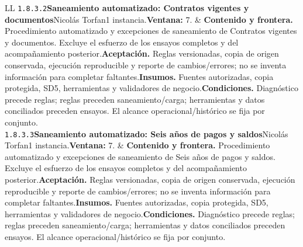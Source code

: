 \begin{longtable}{L{\tabcolsep\relax}L{\tabcolsep\relax}}
\texttt{1.\allowbreak{}8.\allowbreak{}3.\allowbreak{}2}\newline{}\textbf{Saneamiento automatizado: Contratos vigentes y documentos}\newline{}Nicolás Torfan\newline{}1 instancia.\newline{}\textbf{Ventana:} 7. & \textbf{Contenido y frontera.} Procedimiento automatizado y excepciones de saneamiento de Contratos vigentes y documentos. Excluye el esfuerzo de los ensayos completos y del acompañamiento posterior.\newline{}\textbf{Aceptación.} Reglas versionadas, copia de origen conservada, ejecución reproducible y reporte de cambios/errores; no se inventa información para completar faltantes.\newline{}\textbf{Insumos.} Fuentes autorizadas, copia protegida, SD5, herramientas y validadores de negocio.\newline{}\textbf{Condiciones.} Diagnóstico precede reglas; reglas preceden saneamiento/carga; herramientas y datos conciliados preceden ensayos. El alcance operacional/histórico se fija por conjunto.\\\hline
\texttt{1.\allowbreak{}8.\allowbreak{}3.\allowbreak{}3}\newline{}\textbf{Saneamiento automatizado: Seis años de pagos y saldos}\newline{}Nicolás Torfan\newline{}1 instancia.\newline{}\textbf{Ventana:} 7. & \textbf{Contenido y frontera.} Procedimiento automatizado y excepciones de saneamiento de Seis años de pagos y saldos. Excluye el esfuerzo de los ensayos completos y del acompañamiento posterior.\newline{}\textbf{Aceptación.} Reglas versionadas, copia de origen conservada, ejecución reproducible y reporte de cambios/errores; no se inventa información para completar faltantes.\newline{}\textbf{Insumos.} Fuentes autorizadas, copia protegida, SD5, herramientas y validadores de negocio.\newline{}\textbf{Condiciones.} Diagnóstico precede reglas; reglas preceden saneamiento/carga; herramientas y datos conciliados preceden ensayos. El alcance operacional/histórico se fija por conjunto.\\\hline

\end{longtable}
